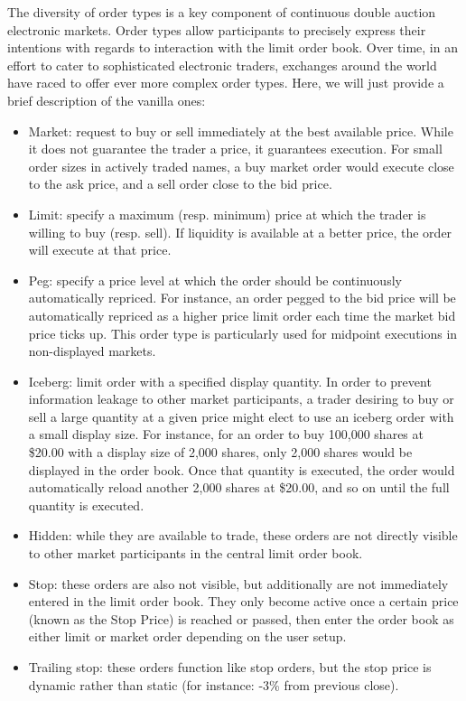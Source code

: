 The diversity of order types is a key component of continuous double auction electronic markets. Order types allow participants to precisely express their intentions with regards to interaction with the limit order book. Over time, in an effort to cater to sophisticated electronic traders, exchanges around the world have raced to offer ever more complex order types. Here, we will just provide a brief description of the vanilla ones:

\begin{itemize}
\item  Market: request to buy or sell immediately at the best available price. While it does not guarantee the trader a price, it guarantees execution. For small order sizes in actively traded names, a buy market order would execute close to the ask price, and a sell order close to the bid price.
\item  Limit: specify a maximum (resp. minimum) price at which the trader is willing to buy (resp. sell). If liquidity is available at a better price, the order will execute at that price.
\item  Peg: specify a price level at which the order should be continuously automatically repriced. For instance, an order pegged to the bid price will be automatically repriced as a higher price limit order each time the market bid price ticks up. This order type is particularly used for midpoint executions in non-displayed markets.
\item  Iceberg: limit order with a specified display quantity. In order to prevent information leakage to other market participants, a trader desiring to buy or sell a large quantity at a given price might elect to use an iceberg order with a small display size. For instance, for an order to buy 100,000 shares at \$20.00 with a display size of 2,000 shares, only 2,000 shares would be displayed in the order book. Once that quantity is executed, the order would automatically reload another 2,000 shares at \$20.00, and so on until the full quantity is executed.
\item  Hidden: while they are available to trade, these orders are not directly visible to other market participants in the central limit order book. 
\item  Stop: these orders are also not visible, but additionally are not immediately entered in the limit order book. They only become active once a certain price (known as the Stop Price) is reached or passed, then enter the order book as either limit or market order depending on the user setup.
\item  Trailing stop: these orders function like stop orders, but the stop price is dynamic rather than static (for instance: -3\% from previous close).


\end{itemize}
